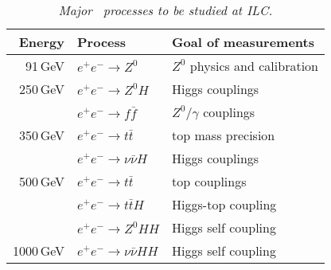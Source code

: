 
\begin{table}[H]
\centering

\begin{tabular}{@{}rll@{}}
\toprule
Energy & Process & Goal of measurements\\ 
\midrule

91\,GeV  & $e^+e^- \to Z^0$  		& $Z^0$ physics and calibration \\
250\,GeV & $e^+e^- \to Z^0H$  		& Higgs couplings \\
		 & $e^+e^- \to f\bar{f}$  	& $Z^0/\gamma$ couplings \\
350\,GeV & $e^+e^- \to t\bar{t}$ 	& top mass precision \\
		 & $e^+e^- \to \nu\bar{\nu}H$ & Higgs couplings \\
500\,GeV & $e^+e^- \to t\bar{t}$ 	& top couplings \\
 		 & $e^+e^- \to t\bar{t}H$ 	& Higgs-top coupling \\ 
 		 & $e^+e^- \to Z^0HH$ 		& Higgs self coupling \\ 
1000\,GeV & $e^+e^- \to \nu\bar{\nu}HH$&  Higgs self coupling \\
 \bottomrule
\end{tabular}

\caption{\sl Major \sm\ processes to be studied at ILC. \cite{bib:ILC}}
\label{table:SMILCmeasurements}
\end{table}